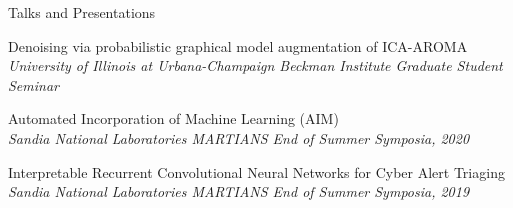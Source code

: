 \documentclass{resume} %
\begin{document}

\begin{rSection}{Talks and Presentations}
\begin{etaremune}[label={\arabic*.}]
    \setlength\itemsep{0em}

    \item Denoising via probabilistic graphical model augmentation of ICA-AROMA\\
    \textit{University of Illinois at Urbana-Champaign Beckman Institute Graduate Student Seminar}

    \item Automated Incorporation of Machine Learning (AIM) \\
    \textit{Sandia National Laboratories MARTIANS End of Summer Symposia, 2020}

    \item Interpretable Recurrent Convolutional Neural Networks for Cyber Alert Triaging \\
    \textit{Sandia National Laboratories MARTIANS End of Summer Symposia, 2019}
\end{etaremune}
\end{rSection}

\end{document}
